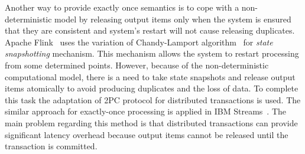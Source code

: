 Another way to provide exactly once semantics is to cope with a non-deterministic model by releasing output items only when the system is ensured that they are consistent and system's restart will not cause releasing duplicates. Apache Flink~\cite{Carbone:2017:SMA:3137765.3137777} uses the variation of Chandy-Lamport algorithm~\cite{Chandy:1985:DSD:214451.214456} for {\it state snapshotting} mechanism. This mechanism allows the system to restart processing from some determined points. However, because of the non-deterministic computational model, there is a need to take state snapshots and release output items atomically to avoid producing duplicates and the loss of data. To complete this task the adaptation of 2PC protocol for distributed transactions is used. The similar approach for exactly-once processing is applied in IBM Streams~\cite{jacques2016consistent}. The main problem regarding this method is that distributed transactions can provide significant latency overhead because output items cannot be released until the transaction is committed.  

